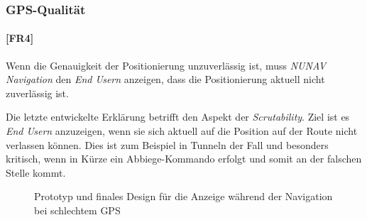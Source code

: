\subsubsection{GPS-Qualität}
\label{sec:gps_accuracy_definition}

\paragraph{[FR4]} Wenn die Genauigkeit der Positionierung unzuverlässig ist, muss \textit{NUNAV Navigation} den \textit{End Usern} anzeigen, dass die Positionierung aktuell nicht zuverlässig ist.

Die letzte entwickelte Erklärung betrifft den Aspekt der \textit{Scrutability}. Ziel ist es \textit{End Usern} anzuzeigen, wenn sie sich aktuell auf die Position auf der Route nicht verlassen können. Dies ist zum Beispiel in Tunneln der Fall und besonders kritisch, wenn in Kürze ein Abbiege-Kommando erfolgt und somit an der falschen Stelle kommt.

\begin{figure}[htb!]
    \centering
    \hspace{.055\linewidth}
    \caption{Prototyp und finales Design für die Anzeige während der Navigation bei schlechtem GPS}
    \label{fig:prototype_position_accuracy}
\end{figure}

